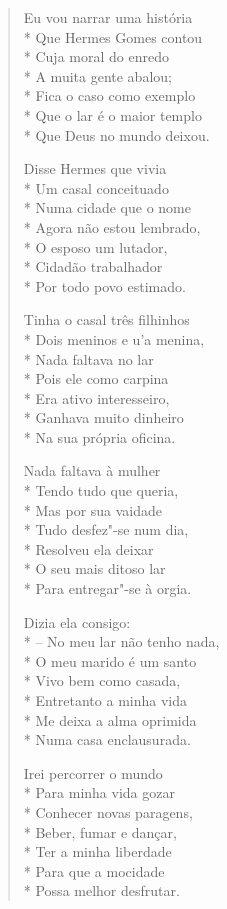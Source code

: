 \begin{verse}
Eu vou narrar uma história\\*
Que Hermes Gomes contou\\*
Cuja moral do enredo\\*
A muita gente abalou;\\*
Fica o caso como exemplo\\*
Que o lar é o maior templo\\*
Que Deus no mundo deixou.

Disse Hermes que vivia\\*
Um casal conceituado\\*
Numa cidade que o nome\\*
Agora não estou lembrado,\\*
O esposo um lutador,\\*
Cidadão trabalhador\\*
Por todo povo estimado.

Tinha o casal três filhinhos\\*
Dois meninos e u'a menina,\\*
Nada faltava no lar\\*
Pois ele como carpina\\*
Era ativo interesseiro,\\*
Ganhava muito dinheiro\\*
Na sua própria oficina.

Nada faltava à mulher\\*
Tendo tudo que queria,\\*
Mas por sua vaidade\\*
Tudo desfez"-se num dia,\\*
Resolveu ela deixar\\*
O seu mais ditoso lar\\*
Para entregar"-se à orgia.

Dizia ela consigo:\\*
--  No meu lar não tenho nada,\\*
O meu marido é um santo\\*
Vivo bem como casada,\\*
Entretanto a minha vida\\*
Me deixa a alma oprimida\\*
Numa casa enclausurada.

Irei percorrer o mundo\\*
Para minha vida gozar\\*
Conhecer novas paragens,\\*
Beber, fumar e dançar,\\*
Ter a minha liberdade\\*
Para que a mocidade\\*
Possa melhor desfrutar.


\end{verse}
